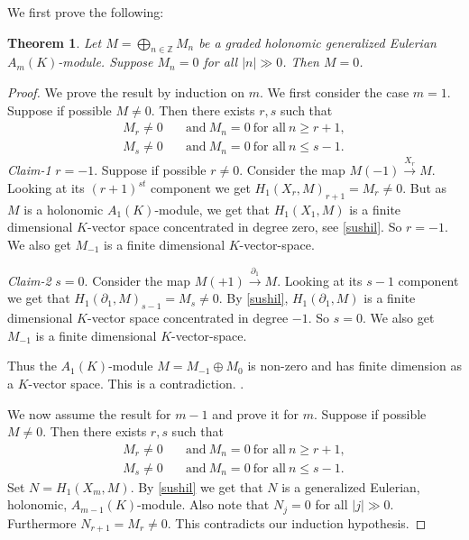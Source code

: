 \documentclass{amsart}
\newcommand{\ZZ}{\mathbb{Z} }
\theoremstyle{plain}
\newtheorem{theorem}{Theorem}[section]
\theoremstyle{definition}
\theoremstyle{remark}
\begin{document}
 We first prove the following:
 \begin{theorem}\label{Weyl}
  Let $M = \bigoplus_{n\in \ZZ} M_n$ be a graded holonomic generalized Eulerian $A_m(K)$-module.
  Suppose $M_n = 0$ for all $|n| \gg 0$. Then $M = 0$.
 \end{theorem}
\begin{proof}
We prove the result by induction on $m$. We first consider the case $m = 1$.
Suppose if possible $M \neq 0$. Then there exists $r, s$ such that
 \begin{align*}
  M_r \neq 0 &\quad \text{and} \ M_n = 0 \ \text{for all} \ n \geq r+1, \\
  M_s \neq 0 &\quad \text{and} \ M_n = 0 \ \text{for all} \ n \leq s - 1.
 \end{align*}
\textit{Claim-1} $r = -1$. Suppose if possible $r \neq 0$. Consider the map $M(-1) \xrightarrow{X_r} M$. Looking at its $(r + 1)^{st}$
component  we get $H_1(X_r, M)_{r + 1} = M_r \neq 0$. But as $M$ is a holonomic $A_1(K)$-module, 
we get that $H_1(X_1, M)$ is a finite dimensional $K$-vector space
concentrated in degree zero, see \ref{sushil}. So $r = -1$. We also get
$M_{-1}$ is a finite dimensional $K$-vector-space.

\textit{Claim-2} $s = 0$.  Consider the map $M(+1) \xrightarrow{\partial_1} M$. Looking at its
$s-1$ component we get that $H_1(\partial_1, M)_{s-1} = M_s \neq 0$. By \ref{sushil}, $H_1(\partial_1, M)$ is a finite dimensional
$K$-vector space concentrated in degree $-1$.  So $s = 0$. We also get
$M_{-1}$ is a finite dimensional $K$-vector-space.

Thus  the $A_1(K)$-module $M = M_{-1} \oplus M_0$ is non-zero and has finite dimension as a $K$-vector space. This is a contradiction.
\cite[1.4.2]{Bjork}.

We now assume the result for $m -1$ and prove it for $m$.
Suppose if possible $M \neq 0$. Then there exists $r, s$ such that
 \begin{align*}
  M_r \neq 0 &\quad \text{and} \ M_n = 0 \ \text{for all} \ n \geq r+1, \\
  M_s \neq 0 &\quad \text{and} \ M_n = 0 \ \text{for all} \ n \leq s - 1.
 \end{align*}
 Set $N = H_1(X_m, M)$. By \ref{sushil} we get that $N$ is a generalized Eulerian, holonomic, $A_{m-1}(K)$-module.
 Also note that $N_j = 0$ for all $|j| \gg 0$. Furthermore $N_{r+1} = M_r \neq 0$. This contradicts our induction hypothesis.
\end{proof}
\end{document}
